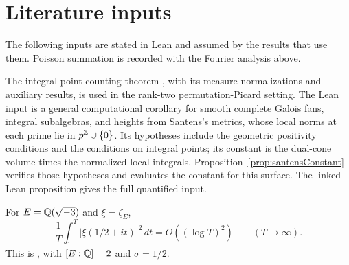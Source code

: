 \chapter{Literature inputs}

The following inputs are stated in Lean and assumed by the results that use them. Poisson summation is recorded with the Fourier analysis above.

\begin{citedtheorem}[Santens]

\label{cite:santens2023integral-toric-counting}


\leanok

The integral-point counting theorem \cite[Theorem~8.7]{santens2023integral}, with its measure normalizations and auxiliary results, is used in the rank-two permutation-Picard setting. The Lean input is a general computational corollary for smooth complete Galois fans, integral subalgebras, and heights from Santens's metrics, whose local norms at each prime lie in $p^{\mathbb{Z}}\cup\{0\}$. Its hypotheses include the geometric positivity conditions and the conditions on integral points; its constant is the dual-cone volume times the normalized local integrals. Proposition~\ref{prop:santensConstant} verifies those hypotheses and evaluates the constant for this surface. The linked Lean proposition gives the full quantified input.

\end{citedtheorem}

\begin{citedtheorem}

\label{cite:chandrasekharanNarasimhan1963-thm4}


\leanok

For $E=\mathbb{Q}(\sqrt{-3})$ and $\xi=\zeta_E$, \[\frac1T\int_1^T|\xi(1/2+it)|^2\,dt=O((\log T)^2)\qquad(T\to\infty).\]This is \cite[Theorem~4, (80)]{chandrasekharanNarasimhan1963}, with $[E:\mathbb{Q}]=2$ and $\sigma=1/2$.

\end{citedtheorem}

